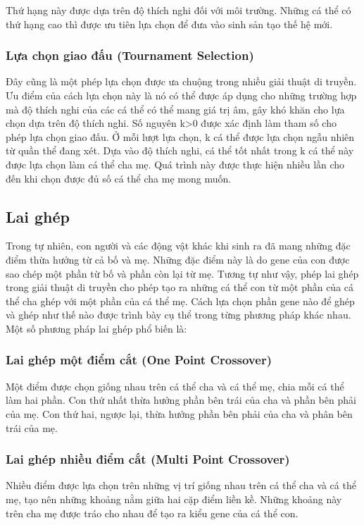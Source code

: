 Thứ hạng này được dựa trên độ thích nghi đối với môi trường. Những cá thể có thứ hạng cao thì được ưu tiên lựa chọn để đưa vào sinh sản tạo thế hệ mới.

\subsubsection{Lựa chọn giao đấu (Tournament Selection)}
Đây cũng là một phép lựa chọn được ưa chuộng trong nhiều giải thuật di truyền. Ưu điểm của cách lựa chọn này là nó có thể được áp dụng cho những trường hợp mà độ thích nghi của các cá thể có thể mang giá trị âm, gây khó khăn cho lựa chọn dựa trên độ thích nghi.
Số nguyên k>0 được xác định làm tham số cho phép lựa chọn giao đấu. Ở mỗi lượt lựa chọn, k  cá thể được lựa chọn ngẫu nhiên từ quần thể đang xét. Dựa vào độ thích nghi, cá thể tốt nhất trong k cá thể này được lựa chọn làm cá thể cha mẹ. Quá trình này được thực hiện nhiều lần cho đến khi chọn được đủ số cá thể cha mẹ mong muốn.

\subsection{Lai ghép} \label{chap_coso:sec_ga:subsec:laighep}
Trong tự nhiên, con người và các động vật khác khi sinh ra đã mang những đặc điểm thừa hưởng từ cả bố và mẹ. Những đặc điểm này là do gene của con được sao chép một phần từ bố và phần còn lại từ mẹ. Tương tự như vậy, phép lai ghép trong giải thuật di truyền cho phép tạo ra những cá thể con từ một phần của cá thể cha ghép với một phần của cá thể mẹ. Cách lựa chọn phần gene nào để ghép và ghép như thế nào được trình bày cụ thể trong từng phương pháp khác nhau. Một số phương pháp lai ghép phổ biến là:

\subsubsection{Lai ghép một điểm cắt (One Point Crossover)}
Một điểm được chọn giống nhau trên cá thể cha và cá thể mẹ, chia mỗi cá thể làm hai phần. Con thứ nhất thừa hưởng phần bên trái của cha và phần bên phải của mẹ. Con thứ hai, ngược lại, thừa hưởng phần bên phải của cha và phân bên trái của mẹ.

\subsubsection{Lai ghép nhiều điểm cắt (Multi Point Crossover)}
Nhiều điểm được lựa chọn trên những vị trí giống nhau trên cá thể cha và cá thể mẹ, tạo nên những khoảng nằm giữa hai cặp điểm liền kề. Những khoảng này trên cha mẹ được tráo cho nhau để tạo ra kiểu gene của cá thể con.

